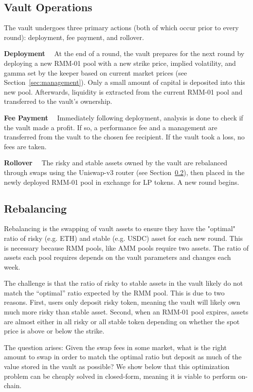 \documentclass[hidelinks, 12pt]{article}
\begin{document}
\subsection{Vault Operations}

The vault undergoes three primary actions (both of which occur prior to every round): deployment, fee payment, and rollover.

\textbf{Deployment}$\quad$ At the end of a round, the vault prepares for the next round by deploying a new RMM-01 pool with a new strike price, implied volatility, and gamma set by the keeper based on current market prices (see Section~\ref{sec:management}). Only a small amount of capital is deposited into this new pool. Afterwards, liquidity is extracted from the current RMM-01 pool and transferred to the vault's ownership. %

\textbf{Fee Payment}$\quad$ Immediately following deployment, analysis is done to check if the vault made a profit. If so, a performance fee and a management are transferred from the vault to the chosen fee recipient. If the vault took a loss, no fees are taken.

\textbf{Rollover}$\quad$ The risky and stable assets owned by the vault are rebalanced through swaps using the Uniswap-v3 router (see Section~\ref{sec:rebalance}), then placed in the newly deployed RMM-01 pool in exchange for LP tokens. A new round begins.

\subsection{Rebalancing}
\label{sec:rebalance}

Rebalancing is the swapping of vault assets to ensure they have the "optimal" ratio of risky (e.g. ETH) and stable (e.g. USDC) asset for each new round. This is necessary because RMM pools, like AMM pools require two assets. The ratio of assets each pool requires depends on the vault parameters and changes each week.

The challenge is that the ratio of risky to stable assets in the vault likely do not match the ``optimal'' ratio expected by the RMM pool.
This is due to two reasons.
First, users only deposit risky token, meaning the vault will likely own much more risky than stable asset.
Second, when an RMM-01 pool expires, assets are almost either in all risky or all stable token depending on whether the spot price is above or below the strike.

The question arises: Given the swap fees in some market, what is the right amount to swap in order to match the optimal ratio but deposit as much of the value stored in the vault as possible? We show below that this optimization problem can be cheaply solved in closed-form, meaning it is viable to perform on-chain.
\end{document}
